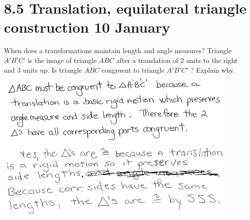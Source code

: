 \documentclass[onlytextwidth]{beamer}
\begin{document}
\section{8.5 Translation, equilateral triangle construction \hfill 10 January}
\begin{frame}{When does a transformations maintain length and angle measures?}
  Triangle $A'B'C'$ is the image of triangle $ABC$ after a translation of 2 units to the right and 3 units up. Is triangle $ABC$ congruent to triangle $A'B'C'$ ? Explain why.\\[0.25cm]
  \pause \includegraphics[width=0.9\textwidth]{../graphics/isometry_JN2018-25-sol.png}\\
  \pause \includegraphics[width=0.9\textwidth]{../graphics/isometry_JN2018-25-sol2.png}
\end{frame}
\end{document}
